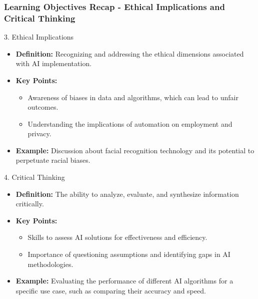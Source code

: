 \documentclass[aspectratio=169]{beamer}
\begin{document}
\begin{frame}[fragile]
    \frametitle{Learning Objectives Recap - Ethical Implications and Critical Thinking}
    \begin{block}{3. Ethical Implications}
        \begin{itemize}
            \item \textbf{Definition:} Recognizing and addressing the ethical dimensions associated with AI implementation.
            \item \textbf{Key Points:}
                \begin{itemize}
                    \item Awareness of biases in data and algorithms, which can lead to unfair outcomes.
                    \item Understanding the implications of automation on employment and privacy.
                \end{itemize}
            \item \textbf{Example:} Discussion about facial recognition technology and its potential to perpetuate racial biases.
        \end{itemize}
    \end{block}

    \begin{block}{4. Critical Thinking}
        \begin{itemize}
            \item \textbf{Definition:} The ability to analyze, evaluate, and synthesize information critically.
            \item \textbf{Key Points:}
                \begin{itemize}
                    \item Skills to assess AI solutions for effectiveness and efficiency.
                    \item Importance of questioning assumptions and identifying gaps in AI methodologies.
                \end{itemize}
            \item \textbf{Example:} Evaluating the performance of different AI algorithms for a specific use case, such as comparing their accuracy and speed.
        \end{itemize}
    \end{block}
\end{frame}
\end{document}
